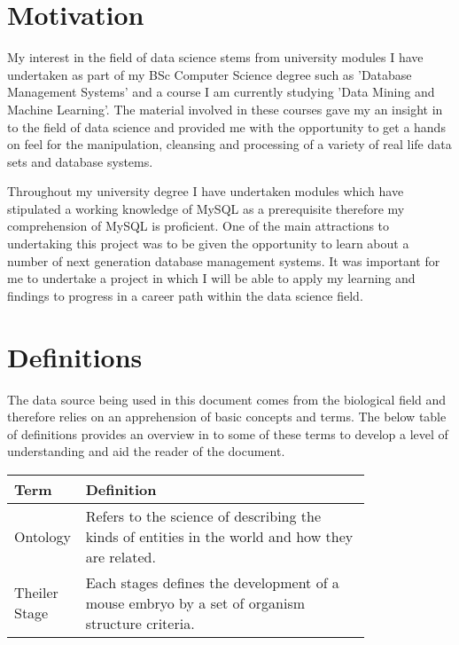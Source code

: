 \section{Motivation}
My interest in the field of data science stems from university modules I have undertaken as part of my BSc Computer Science degree such as 'Database Management Systems' and a course I am currently studying 'Data Mining and Machine Learning'. The material involved in these courses gave my an insight in to the field of data science and provided me with the opportunity to get a hands on feel for the manipulation, cleansing and processing of a variety of real life data sets and database systems.

Throughout my university degree I have undertaken modules which have stipulated a working knowledge of MySQL as a prerequisite therefore my comprehension of MySQL is proficient. One of the main attractions to undertaking this project was to be given the opportunity to learn about a number of next generation database management systems. It was important for me to undertake a project in which I will be able to apply my learning and findings to progress in a career path within the data science field.

\section{Definitions}
The data source being used in this document comes from the biological field and therefore relies on an apprehension of basic concepts and terms. The below table of definitions provides an overview in to some of these terms to develop a level of understanding and aid the reader of the document.
 
\begin{center}
    \begin{tabular}{ | l | p{0.8\linewidth}|}
    \hline
    \textbf{Term} & \textbf{Definition} \\ \hline
    Ontology & Refers to the science of describing the kinds of entities in the world and how they are related. \\ \hline
    Theiler Stage & Each stages defines the development of a mouse embryo by a set of organism structure criteria. \\ \hline
    \end{tabular}
\end{center}

